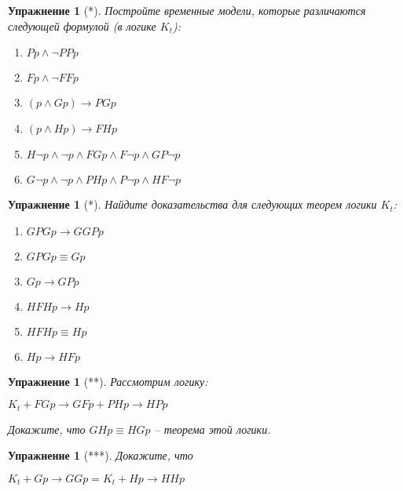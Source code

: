 \documentclass[11pt]{article}
\newtheorem{exercise}[theorem]{Упражнение}
\begin{document}
\begin{exercise}[*]Постройте временные модели, которые различаются следующей формулой (в логике $K_t$):
\begin{multicols}{2}
\begin{enumerate}
    \item $Pp \wedge \neg PPp$
    \item $Fp \wedge \neg FFp$
    \item $(p \wedge Gp) \to PGp$
    \item $(p \wedge Hp) \to FHp$
	\item $H \neg p \wedge \neg p \wedge FGp \wedge F \neg p  \wedge GP \neg p$
	\item $G\neg p \wedge \neg p \wedge PHp  \wedge P \neg p \wedge HF \neg p$
\end{enumerate}
\end{multicols}	
\end{exercise}


\begin{exercise}[*] Найдите доказательства для следующих теорем логики $K_t$:
\begin{multicols}{3}
\begin{enumerate}
	\item $GPGp \to GGPp$
	\item $GPG p \equiv Gp$
	\item $Gp \to GPp$
	\item $HFHp \to Hp$
	\item $HFHp \equiv Hp$
	\item $Hp \to HFp$
\end{enumerate}
\end{multicols}

\end{exercise}


\begin{exercise}[**] Рассмотрим логику:
\begin{center}
$K_t + FGp \to  GFp + PHp \to  HPp$	
\end{center}
Докажите, что  $GHp \equiv  HGp$ – теорема этой логики.
\end{exercise}

\begin{exercise}[***] Докажите, что 
\begin{center}
$K_t + G p \to GGp  = K_t + Hp \to HH p$	
\end{center}
\end{exercise}
\end{document}
